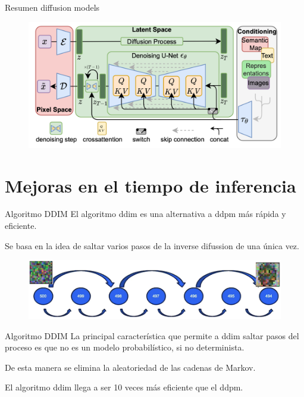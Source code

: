 \begin{frame}{Resumen diffusion models}
\begin{figure}
    \centering
    \includegraphics[width=\textwidth]{Slides/figures/Diffusion_Models/Difussion_Model.png}
    \caption{\cite{rombach2022high}}
\end{figure}
\end{frame}

\section{Mejoras en el tiempo de inferencia}

\begin{frame}{Algoritmo DDIM}
El algoritmo \gls{ddim} \cite{song2020denoising} es una alternativa a \gls{ddpm} más \alert{rápida y eficiente}.

Se basa en la idea de saltar varios pasos de la \alert{inverse difussion} de una única vez.

\begin{figure}
    \centering
    \includegraphics[width=\textwidth]{Slides/figures/Diffusion_Models/DDIM.png}
    \caption{\cite{DeepLearningDifussionModelCourse}}
\end{figure}
\end{frame}

\begin{frame}{Algoritmo DDIM}
La principal característica que permite a \gls{ddim} \alert{saltar pasos} del proceso es que no es un modelo probabilístico, si no \alert{determinista}.

De esta manera se elimina la \alert{aleatoriedad} de las cadenas de Markov.

El algoritmo \gls{ddim} llega a ser \alert{10 veces} más eficiente que el \gls{ddpm}.
\end{frame}

